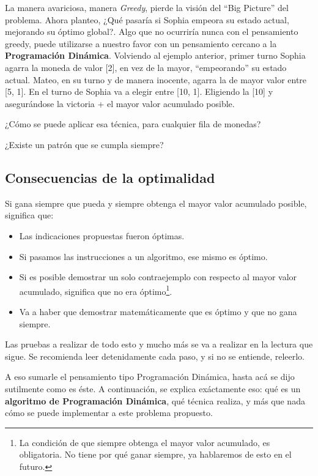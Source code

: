 La manera avariciosa, manera \textit{Greedy}, pierde la visión del ``Big Picture'' del problema. Ahora planteo, ¿Qué pasaría si Sophia empeora su estado actual, mejorando su óptimo global?. Algo que no ocurriría nunca con el pensamiento greedy, puede utilizarse a nuestro favor con un pensamiento cercano a la \textbf{Programación Dinámica}. Volviendo al ejemplo anterior, primer turno Sophia agarra la moneda de valor [2], en vez de la mayor, ``empeorando'' su estado actual. Mateo, en su turno y de manera inocente, agarra la de mayor valor entre [5, 1]. En el turno de Sophia va a elegir entre [10, 1]. Eligiendo la [10] y asegurándose la victoria + el mayor valor acumulado posible.

¿Cómo se puede aplicar esa técnica, para cualquier fila de monedas?

¿Existe un patrón que se cumpla siempre?


\subsection{Consecuencias de la optimalidad}

Si gana siempre que pueda y siempre obtenga el mayor valor acumulado posible, significa que:

\begin{itemize}
    \item Las indicaciones propuestas fueron óptimas.
    \item Si pasamos las instrucciones a un algoritmo, ese mismo es óptimo.
    \item Si es posible demostrar un solo contraejemplo con respecto al mayor valor acumulado, significa que no era óptimo\footnote{La condición de que siempre obtenga el mayor valor acumulado, es obligatoria. No tiene por qué ganar siempre, ya hablaremos de esto en el futuro.}.
    \item Va a haber que demostrar matemáticamente que es óptimo y que no gana siempre.
\end{itemize}


Las pruebas a realizar de todo esto y mucho más se va a realizar en la lectura que sigue. Se recomienda leer detenidamente cada paso, y si no se entiende, releerlo. 

A eso sumarle el pensamiento tipo Programación Dinámica, hasta acá se dijo sutilmente como es éste. A continuación, se explica exáctamente eso: qué es un \textbf{algoritmo de Programación Dinámica}, qué técnica realiza, y más que nada cómo se puede implementar a este problema propuesto.


